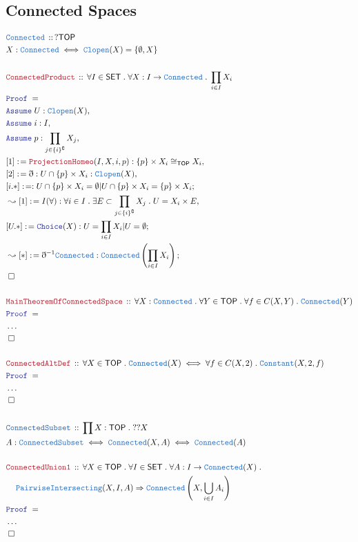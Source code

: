 \documentclass[12pt]{scrartcl}
\newcommand{\TYPE}[1]{\textcolor{NavyBlue}{\mathtt{#1}}}
\newcommand{\LOGIC}[1]{\textcolor{Blue}{\mathtt{#1}}}
\newcommand{\THM}[1]{\textcolor{Maroon}{\mathtt{#1}}}
\renewcommand{\.}{\; . \;}
\newcommand{\de}{: \kern 0.1pc =}
\newcommand{\Theorem}[2]{& \THM{#1} \, :: \, #2 \\ & \Proof = \\ }
\newcommand{\DeclareType}[2]{& \TYPE{#1} \, :: \, #2 \\}
\newcommand{\DefineType}[3]{& #1 : \TYPE{#2} \iff #3 \\}
\newcommand{\DefineNamedType}[4]{& #1 : \TYPE{#2} \iff #3 \iff #4 \\}
\newcommand{\NewLine}{\\ & \kern 1pc}
\newcommand{\Page}[1]{ \begin{align*} #1 \end{align*}   }
\newcommand{ \bd }{ \ByDef }
\newcommand{\NoProof}{ & \ldots \\ \EndProof}
\newcommand{\Imply}{\Rightarrow}
\renewcommand{\c}{\complement}
\newcommand{\Say}[3]{& #1 \de #2 : #3, \\}
\newcommand{\Conclude}[3]{& #1 \de #2 : #3; \\}
\newcommand{\Derive}[3]{& \leadsto #1 \de #2 : #3, \\}
\newcommand{\DeriveConclude}[3]{& \leadsto #1 \de #2 : #3 ; \\}
\newcommand{\Assume}[2]{& \LOGIC{Assume} \; #1 : #2, \\}
\newcommand{\QED}{\; \square}
\newcommand{\EndProof}{& \QED \\}
\newcommand{\ByDef}{\eth}
\newcommand{\Proof}{\LOGIC{Proof} \; }
\newcommand{\SET}{\mathsf{SET}}
\newcommand{\TOP}{\mathsf{TOP}}
\begin{document}
\subsection{Connected Spaces}
\Page{
	\DeclareType{Connected}{?\TOP}
	\DefineType{X}{Connected}{\TYPE{Clopen}(X) = \{ \emptyset, X \}}
	\\
	\Theorem{ConnectedProduct}{\forall I \in \SET \. \forall X : I \to \TYPE{Connected} \. \prod_{i \in I} X_i }
	\Assume{U}{\TYPE{Clopen}(X)}
	\Assume{i}{I}
	\Assume{p}{\prod_{j \in \{i\}^\c} X_j}
	\Say{[1]}{\THM{ProjectionHomeo}(I,X,i,p)}{ \{p\} \times X_i \cong_{\TOP} X_i  }
	\Say{[2]}{\bd  }{ U \cap \{p\} \times X_i  : \TYPE{Clopen}(X)  }
	\Conclude{[i.*]}{  }{ U \cap \{p\} \times X_i  = \emptyset |  U \cap \{p\} \times X_i  = \{p\} \times X_i  }
	\Derive{[1]}{I(\forall)}{ \forall i \in I \. \exists E \subset  \prod_{j \in \{i\}^\c} X_j \.  U = X_i \times E  }
	\Conclude{[U.*]}{\LOGIC{Choice}(X)}{ U = \prod_{i \in I} X_i  | U = \emptyset}
	\DeriveConclude{[*]}{\bd^{-1}\TYPE{Connected}}{\TYPE{Connected}\left(\prod_{i \in I} X_i\right)}
	\EndProof
	\\
	\Theorem{MainTheoremOfConnectedSpace}{\forall X : \TYPE{Connected} \. \forall Y \in \TOP \. \forall f \in C(X,Y) \. \TYPE{Connected}(Y)}
	\NoProof
	\\
	\Theorem{ConnectedAltDef}{\forall X \in \TOP \. \TYPE{Connected}(X) \iff \forall f \in C(X,2) \.  \TYPE{Constant}(X,2,f)}
	\NoProof
	\\
	\DeclareType{ConnectedSubset}{\prod X : \TOP \. ??X}
	\DefineNamedType{A}{ConnectedSubset}{\TYPE{Connected}(X,A)}{\TYPE{Connected}(A)}
	\\
	\Theorem{ConnectedUnion1}{\forall X \in \TOP \. \forall I \in \SET \. \forall A : I \to \TYPE{Connected}(X) \. \NewLine \TYPE{PairwiseIntersecting}(X,I,A) \Imply \TYPE{Connected}\left(X,\bigcup_{i \in I} A_i \right)}
	\NoProof
}
\end{document}
